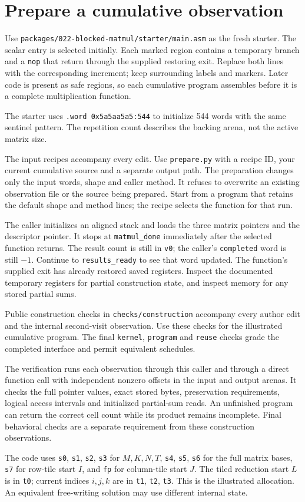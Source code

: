 \section{Prepare a cumulative observation}
Use \texttt{packages/022-blocked-matmul/starter/main.asm} as the fresh starter. The scalar
entry is selected initially. Each marked region contains a temporary branch and a
\texttt{nop} that return through the supplied restoring exit. Replace both lines
with the corresponding increment; keep surrounding labels and markers. Later code
is present as safe regions, so each cumulative program assembles before it is a
complete multiplication function.

The starter uses \texttt{.word 0x5a5aa5a5:544} to initialize 544 words with the same sentinel pattern. The repetition count describes the backing arena, not the active matrix size.

The input recipes accompany every edit. Use \texttt{prepare.py} with a recipe ID,
your current cumulative source and a separate output path. The preparation changes
only the input words, shape and caller method. It refuses to overwrite an existing
observation file or the source being prepared. Start from a program that retains
the default shape and method lines; the recipe selects the function for that run.

The caller initializes an aligned stack and loads the three matrix pointers and
the descriptor pointer. It stops at \texttt{matmul\_done} immediately after the
selected function returns. The result count is still in \texttt{v0}; the caller's
\texttt{completed} word is still \(-1\). Continue to \texttt{results\_ready} to
see that word updated. The function's supplied exit has already restored saved
registers. Inspect the documented temporary registers for partial construction
state, and inspect memory for any stored partial sums.

Public construction checks in \texttt{checks/construction} accompany every author edit and the internal second-visit observation. Use these checks for the illustrated cumulative program. The final \texttt{kernel}, \texttt{program} and \texttt{reuse} checks grade the completed interface and permit equivalent schedules.

The verification runs each observation through this caller and through a direct
function call with independent nonzero offsets in the input and output arenas.
It checks the full pointer values, exact stored bytes, preservation requirements,
logical access intervals and initialized partial-sum reads. An unfinished program
can return the correct cell count while its product remains incomplete. Final
behavioral checks are a separate requirement from these construction observations.

The code uses \texttt{s0}, \texttt{s1}, \texttt{s2}, \texttt{s3} for \(M,K,N,T\),
\texttt{s4}, \texttt{s5}, \texttt{s6} for the full matrix bases, \texttt{s7} for
row-tile start \(I\), and \texttt{fp} for column-tile start \(J\).
The tiled reduction start \(L\) is in \texttt{t0}; current indices \(i,j,k\)
are in \texttt{t1}, \texttt{t2}, \texttt{t3}. This is the illustrated allocation.
An equivalent free-writing solution may use different internal state.
